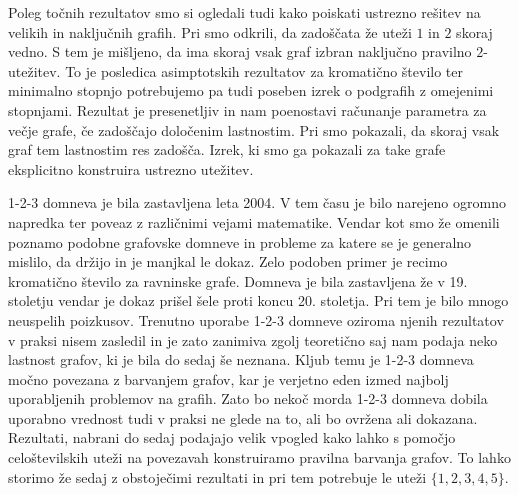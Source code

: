 \documentclass[12pt,a4paper,twoside]{article}
\newcommand{\literatura}{literatura}  %
\theoremstyle{definition} %
\theoremstyle{plain} %
\numberwithin{equation}{section}  %
\begin{document}
Poleg točnih rezultatov smo si ogledali tudi kako poiskati ustrezno rešitev na velikih in naključnih grafih. Pri smo odkrili, da zadoščata že uteži $1$ in $2$ skoraj vedno. S tem je mišljeno, da ima skoraj vsak graf izbran naključno pravilno $2$-utežitev. To je posledica asimptotskih rezultatov za kromatično število ter minimalno stopnjo potrebujemo pa tudi poseben izrek o podgrafih z omejenimi stopnjami. Rezultat je presenetljiv in nam poenostavi računanje parametra za večje grafe, če zadoščajo določenim lastnostim. Pri smo pokazali, da skoraj vsak graf tem lastnostim res zadošča. Izrek, ki smo ga pokazali za take grafe eksplicitno konstruira ustrezno utežitev.

1-2-3 domneva je bila zastavljena leta 2004. V tem času je bilo narejeno ogromno napredka ter poveaz z različnimi vejami matematike. Vendar kot smo že omenili poznamo podobne grafovske domneve in probleme za katere se je generalno mislilo, da držijo in je manjkal le dokaz. Zelo podoben primer je recimo kromatično število za ravninske grafe. Domneva je bila zastavljena že v 19. stoletju vendar je dokaz prišel šele proti koncu 20. stoletja. Pri tem je bilo mnogo neuspelih poizkusov. Trenutno uporabe 1-2-3 domneve oziroma njenih rezultatov v praksi nisem zasledil in je zato zanimiva zgolj teoretično saj nam podaja neko lastnost grafov, ki je bila do sedaj še neznana. Kljub temu je 1-2-3 domneva močno povezana z barvanjem grafov, kar je verjetno eden izmed najbolj uporabljenih problemov na grafih. Zato bo nekoč morda 1-2-3 domneva dobila uporabno vrednost tudi v praksi ne glede na to, ali bo ovržena ali dokazana. Rezultati, nabrani do sedaj podajajo velik vpogled kako lahko s pomočjo celoštevilskih uteži na povezavah konstruiramo pravilna barvanja grafov. To lahko storimo že sedaj z obstoječimi rezultati in pri tem potrebuje le uteži $\{1,2,3,4,5\}$.


 
\cleardoublepage                           %

\cleardoublepage                           %
\printindex
\end{document}
